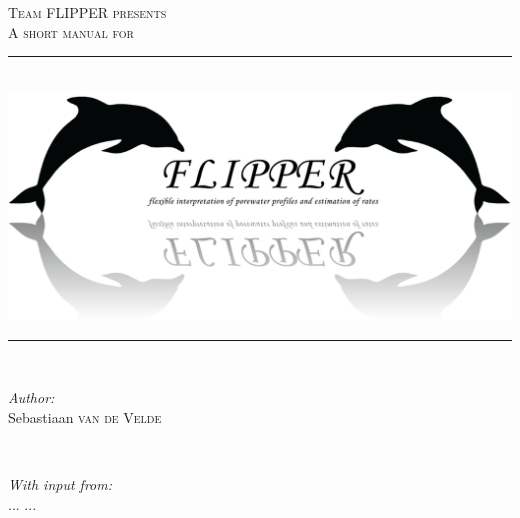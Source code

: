 \documentclass[10pt]{article}
\begin{document}
\begin{titlepage}

\newcommand{\HRule}{\rule{\linewidth}{0.5mm}} %

\center %
 

\textsc{\LARGE Team FLIPPER presents}\\[1.5cm] %
\vspace{3cm}
\textsc{\Large A short manual for}\\[0.5cm] %


\HRule \\[0.4cm]
\includegraphics[width=\linewidth]{FLIPPERDOC_Figures/Logo_FLIPPER.png}\\[0.1cm]
\HRule \\[1.5cm]
 

\begin{minipage}{0.4\textwidth}
\begin{flushleft} \large
\emph{Author:}\\
Sebastiaan \textsc{van de Velde} %
\end{flushleft}
\end{minipage}
~
\begin{minipage}{0.4\textwidth}
\begin{flushright} \large
\emph{With input from:} \\
... \textsc{...} %
\end{flushright}
\end{minipage}\\[2cm]


\end{titlepage}
\end{document}
